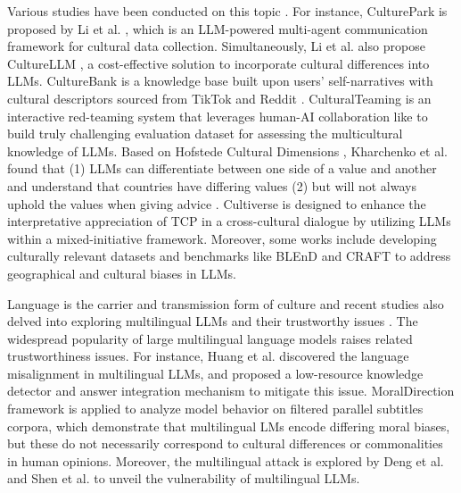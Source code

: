 Various studies have been conducted on this topic \cite{liu2024culturally, li2024culturellm, li2024culturepark, shi2024culturebank, chiu2024culturalteaming, zhang2024cultiverse, wang2024craft, lu2024benchmarking, zhou2024empowering, dong2024culture}. For instance, CulturePark is proposed by Li et al. \cite{li2024culturepark}, which is an LLM-powered multi-agent communication framework for cultural data collection. Simultaneously, Li et al. also propose CultureLLM \cite{li2024culturellm}, a cost-effective solution to incorporate cultural differences into LLMs. CultureBank \cite{shi2024culturebank} is a knowledge base built upon users' self-narratives with cultural descriptors sourced from TikTok \cite{tiktok} and Reddit \cite{reddit}. CulturalTeaming \cite{chiu2024culturalteaming} is an interactive red-teaming system that leverages human-AI collaboration like \cite{li2024think, huang20241+} to build truly challenging evaluation dataset for assessing the multicultural knowledge of LLMs. Based on Hofstede Cultural Dimensions \cite{hofstede2010cultures}, Kharchenko et al. found that (1) LLMs can differentiate between one side of a value and another and understand that countries have differing values (2) but will not always uphold the values when giving advice \cite{kharchenko2024well}. Cultiverse \cite{zhang2024cultiverse} is designed to enhance the interpretative appreciation of TCP in a cross-cultural dialogue by utilizing LLMs within a mixed-initiative framework. Moreover, some works include developing culturally relevant datasets and benchmarks like BLEnD \cite{zhou2024blend} and CRAFT \cite{wang2024craft} to address geographical and cultural biases in LLMs. 

Language is the carrier and transmission form of culture and recent studies also delved into exploring multilingual LLMs and their trustworthy issues \cite{DoMultilingualLLMs, khandelwal2024moral, huang20241+, Havaldar2023MultilingualLM}. The widespread popularity of large multilingual language models \cite{Qin2024MultilingualLL, Li2024XInstructionAL, Xu2024ASO, Chen2024Orion14BOM, Etxaniz2023DoML, Philippy2023TowardsAC} raises related trustworthiness issues. For instance, Huang et al. \cite{huang20241+} discovered the language misalignment in multilingual LLMs, and proposed a low-resource knowledge detector and answer integration mechanism to mitigate this issue. MoralDirection framework \cite{Hmmerl2022SpeakingML} is applied to analyze model behavior on filtered parallel subtitles corpora, which demonstrate that multilingual LMs encode differing moral biases, but these do not necessarily correspond to cultural differences or commonalities in human opinions. Moreover, the multilingual attack is explored by Deng et al. \cite{deng2023multilingual}and Shen et al. \cite{Shen2024TheLB} to unveil the vulnerability of multilingual LLMs.

